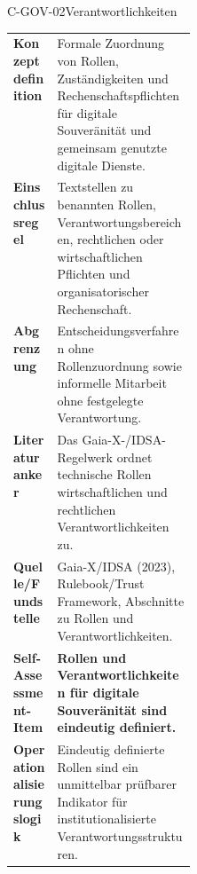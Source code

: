 \documentclass[10pt,a4paper]{article}
\begin{document}
\begin{codecard}{C-GOV-02}{Verantwortlichkeiten}
\begin{tabularx}{\linewidth}{@{}>{\RaggedRight\arraybackslash\bfseries\color{DeepNavy}}p{0.245\linewidth}>{\RaggedRight\arraybackslash}X@{}}
Konzeptdefinition & Formale Zuordnung von Rollen, Zuständigkeiten und Rechenschaftspflichten für digitale Souveränität und gemeinsam genutzte digitale Dienste. \\
\arrayrulecolor{SoftRule}\hline
Einschlussregel & Textstellen zu benannten Rollen, Verantwortungsbereichen, rechtlichen oder wirtschaftlichen Pflichten und organisatorischer Rechenschaft. \\
\arrayrulecolor{SoftRule}\hline
Abgrenzung & Entscheidungsverfahren ohne Rollenzuordnung sowie informelle Mitarbeit ohne festgelegte Verantwortung. \\
\arrayrulecolor{SoftRule}\hline
Literaturanker & Das Gaia-X-/IDSA-Regelwerk ordnet technische Rollen wirtschaftlichen und rechtlichen Verantwortlichkeiten zu. \\
\arrayrulecolor{SoftRule}\hline
Quelle/Fundstelle & Gaia-X/IDSA (2023), Rulebook/Trust Framework, Abschnitte zu Rollen und Verantwortlichkeiten. \\
\arrayrulecolor{SoftRule}\hline
Self-Assessment-Item & \textbf{Rollen und Verantwortlichkeiten für digitale Souveränität sind eindeutig definiert.} \\
\arrayrulecolor{SoftRule}\hline
Operationalisierungslogik & Eindeutig definierte Rollen sind ein unmittelbar prüfbarer Indikator für institutionalisierte Verantwortungsstrukturen. \\
\end{tabularx}
\end{codecard}
\end{document}
